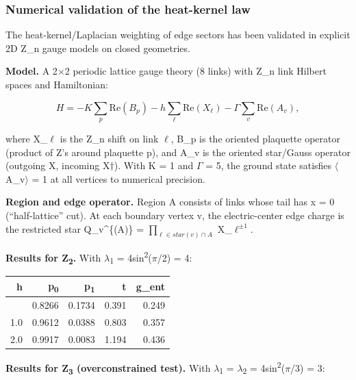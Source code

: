 \documentclass[11pt,a4paper]{article}
\theoremstyle{remark}
\begin{document}
\subsubsection{Numerical validation of the heat-kernel law}\label{numerical-validation-of-the-heat-kernel-law}

The heat-kernel/Laplacian weighting of edge sectors has been validated in
explicit 2D Z\_n gauge models on closed geometries.

\textbf{Model.} A 2\ensuremath{\times}2 periodic lattice gauge theory (8 links) with
Z\_n link Hilbert spaces and Hamiltonian:

\[
H = -K \sum_p \mathrm{Re}(B_p) - h \sum_\ell \mathrm{Re}(X_\ell) - \Gamma \sum_v \mathrm{Re}(A_v),
\]

where X\_\ensuremath{\ell} is the Z\_n shift on link \ensuremath{\ell}, B\_p is the oriented
plaquette operator (product of Z's around plaquette p), and A\_v is the
oriented star/Gauss operator (outgoing X, incoming X\ensuremath{\dagger}). With
K = 1 and \ensuremath{\Gamma} = 5, the ground state satisfies \ensuremath{\langle}A\_v\ensuremath{\rangle} = 1
at all vertices to numerical precision.

\textbf{Region and edge operator.} Region A consists of links whose tail has
x = 0 (``half-lattice'' cut). At each boundary vertex v, the electric-center
edge charge is the restricted star Q\_v\^{}\{(A)\} = $\prod_{\ensuremath{\ell} \ensuremath{\in} star(v) \ensuremath{\cap} A}$ X\_$\ell^{\ensuremath{\pm}1}$.

\textbf{Results for Z\textsubscript{2}.} With \ensuremath{\lambda}\textsubscript{1} = 4sin\textsuperscript{2}(\ensuremath{\pi}/2) = 4:

{\def\LTcaptype{none} %
\begin{longtable}[]{@{}rrrrr@{}}
\toprule\noalign{}
h & p\textsubscript{0} & p\textsubscript{1} & t & g\_ent \\
\midrule\noalign{}
\endhead
\bottomrule\noalign{}
\endlastfoot
0.5 & 0.8266 & 0.1734 & 0.391 & 0.249 \\
1.0 & 0.9612 & 0.0388 & 0.803 & 0.357 \\
2.0 & 0.9917 & 0.0083 & 1.194 & 0.436 \\
\end{longtable}
}

\textbf{Results for Z\textsubscript{3} (overconstrained test).} With
\ensuremath{\lambda}\textsubscript{1} = \ensuremath{\lambda}\textsubscript{2} = 4sin\textsuperscript{2}(\ensuremath{\pi}/3) = 3:
\end{document}
